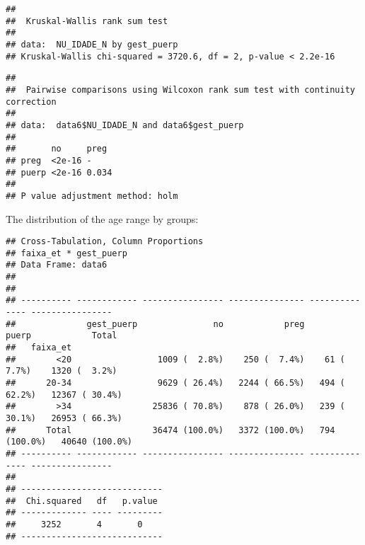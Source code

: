 \documentclass[
]{article}
\newenvironment{Shaded}{\begin{snugshade}}{\end{snugshade}}
\newcommand{\DataTypeTok}[1]{\textcolor[rgb]{0.13,0.29,0.53}{#1}}
\newcommand{\KeywordTok}[1]{\textcolor[rgb]{0.13,0.29,0.53}{\textbf{#1}}}
\newcommand{\NormalTok}[1]{#1}
\newcommand{\OperatorTok}[1]{\textcolor[rgb]{0.81,0.36,0.00}{\textbf{#1}}}
\newcommand{\OtherTok}[1]{\textcolor[rgb]{0.56,0.35,0.01}{#1}}
\newcommand{\StringTok}[1]{\textcolor[rgb]{0.31,0.60,0.02}{#1}}
\begin{document}
\begin{verbatim}
## 
##  Kruskal-Wallis rank sum test
## 
## data:  NU_IDADE_N by gest_puerp
## Kruskal-Wallis chi-squared = 3720.6, df = 2, p-value < 2.2e-16
\end{verbatim}

\begin{Shaded}
\end{Shaded}

\begin{verbatim}
## 
##  Pairwise comparisons using Wilcoxon rank sum test with continuity correction 
## 
## data:  data6$NU_IDADE_N and data6$gest_puerp 
## 
##       no     preg 
## preg  <2e-16 -    
## puerp <2e-16 0.034
## 
## P value adjustment method: holm
\end{verbatim}

The distribution of the age range by groups:

\begin{Shaded}
\end{Shaded}

\begin{verbatim}
## Cross-Tabulation, Column Proportions  
## faixa_et * gest_puerp  
## Data Frame: data6  
## 
## 
## ---------- ------------ ---------------- --------------- -------------- ----------------
##              gest_puerp               no            preg          puerp            Total
##   faixa_et                                                                              
##        <20                 1009 (  2.8%)    250 (  7.4%)    61 (  7.7%)    1320 (  3.2%)
##      20-34                 9629 ( 26.4%)   2244 ( 66.5%)   494 ( 62.2%)   12367 ( 30.4%)
##        >34                25836 ( 70.8%)    878 ( 26.0%)   239 ( 30.1%)   26953 ( 66.3%)
##      Total                36474 (100.0%)   3372 (100.0%)   794 (100.0%)   40640 (100.0%)
## ---------- ------------ ---------------- --------------- -------------- ----------------
## 
## ----------------------------
##  Chi.squared   df   p.value 
## ------------- ---- ---------
##     3252       4       0    
## ----------------------------
\end{verbatim}
\end{document}
